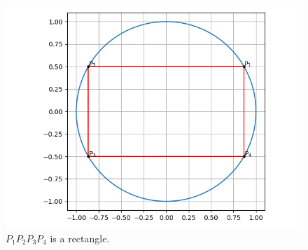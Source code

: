 \documentclass[journal,12pt,twocolumn]{IEEEtran}
\begin{document}
\begin{enumerate}
    \begin{figure}[!ht]
        \centering
        \includegraphics[width=\columnwidth]{figs/circle.png}
        \caption{$P_1P_2P_3P_4$ is a rectangle.}
        \label{fig:circle}
    \end{figure}
\end{enumerate}
\end{document}

